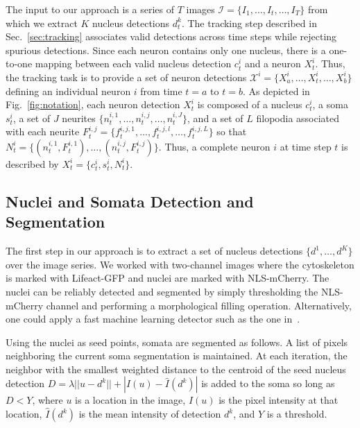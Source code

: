 
\vspace{-3mm}

The  input to  our approach  is a  series of  $T$ images  $\mathcal{I}  = \{I_1,
\ldots,  I_t,  \ldots, I_T\}$  from  which  we  extract $K$  nucleus  detections
$d_t^k$.   The  tracking step  described  in Sec.~\ref{sec:tracking}  associates
valid detections  across time steps  while rejecting spurious  detections. Since
each neuron  contains only  one nucleus, there  is a one-to-one  mapping between
each valid  nucleus detection $c_t^i$ and  a neuron $X_t^i$.  Thus, the tracking
task   is   to  provide   a   set   of   neuron  detections   $\mathcal{X}^i   =
\{X_{a}^i,\ldots,X_t^i,\ldots,X_{b}^i \}$ defining an individual neuron $i$ from
time  $t=a$  to $t=b$.   As  depicted  in  Fig.~\ref{fig:notation}, each  neuron
detection $X_t^i$ is composed of a nucleus $c_t^i$, a soma $s_t^i$, a set of $J$
neurites $\{n_t^{i,1},  \ldots, n_t^{i,j}, \ldots,  n_t^{i,J} \}$, and a  set of
$L$     filopodia    associated     with    each     neurite     $F_t^{i,j}    =
\{f_t^{i,j,1},\ldots,f_t^{i,j,l},\ldots,f_t^{i,j,L}  \}$ so  that  $N_t^i =  \{(
n_t^{i,1},F_t^{i,1}), \ldots,(n_t^{i,j},F_t^{i,j}) \}$.  Thus, a complete neuron
$i$  at time step $t$ is described by $X_t^i = \{ c_t^i, s_t^i, N_t^i \}$.


\vspace{-3mm}
\subsection{Nuclei and Somata Detection and Segmentation}
\vspace{-2mm}
\label{sec:detection}
The  first  step in  our  approach  is to  extract  a  set of  nucleus
detections $\{d^1,\ldots,d^K\}$ over the  image series. We worked with
two-channel  images where the  cytoskeleton  is marked  with
Lifeact-GFP and  nuclei   are   marked   with
NLS-mCherry. The nuclei can be reliably detected and segmented
by simply thresholding  the NLS-mCherry channel and performing  a morphological
filling operation.  Alternatively, one could apply
a  fast machine learning detector such  as the  one
in~\cite{Smith09}.


Using  the nuclei  as  seed points,   somata are  segmented as follows. 
A list of  pixels neighboring the
current  soma  segmentation is  maintained.   At  each iteration,  the
neighbor with  the smallest weighted  distance to the centroid  of the
seed  nucleus  detection  $D  =  \lambda  ||  u  -  d^k||  +  |I(u)  -
\hat{I}(d^k)|$ is added to the soma so long as $D < Y$, where $u$ is a
location  in the  image,  $I(u)$  is  the pixel  intensity at  that
location, $\hat{I}(d^k)$ is the mean intensity of detection $d^k$, and
$Y$ is a threshold.


